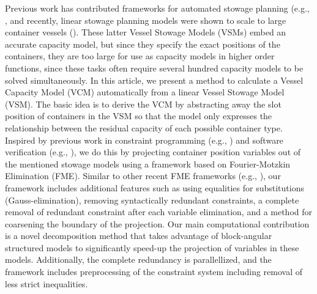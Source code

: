 \documentclass{llncs}
\begin{document}
Previous work has contributed frameworks for automated stowage planning (e.g., \cite{roach00,kimkang02,ambrosino04,low09,delgado09,pacino12}, and recently, linear stowage planning models were shown to scale to large container vessels (\cite{pacino11,AlbertosThesis}). These latter Vessel Stowage Models (VSMs) embed an accurate capacity model, but since they specify the exact positions of the containers, they are too large for use as capacity models in higher order functions, since these tasks often require several hundred capacity models to be solved simultaneously.
In this article, we present a method to calculate a Vessel Capacity Model (VCM) automatically from a linear Vessel Stowage Model (VSM).
The basic idea is to derive the VCM by abstracting away the slot position of containers in the VSM so that the model only expresses the relationship between the residual capacity of each possible container type.
Inspired by previous work in constraint programming (e.g., \cite{lassez90}) and software verification (e.g., \cite{benoy05}), we do this by projecting container position variables out of the mentioned stowage models using a framework based on Fourier-Motzkin Elimination (FME). Similar to other recent FME frameworks (e.g., \cite{simon05,lukatskii08,shapot12}), our framework includes additional features such as using equalities for substitutions (Gauss-elimination), removing syntactically redundant constraints, a complete removal of redundant constraint after each variable elimination, and a method for coarsening the boundary of the projection. Our main computational contribution is a novel decomposition method that takes advantage of block-angular structured models to significantly speed-up the projection of variables in these models. Additionally, the complete redundancy is parallellized, and the framework includes preprocessing of the constraint system including removal of less strict inequalities.
\end{document}
